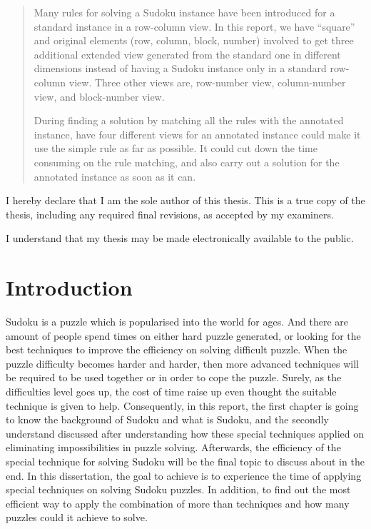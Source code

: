 \documentclass[11pt]{report}
\begin{document}
\begin{abstract}
Many rules for solving a Sudoku instance have been introduced for a standard instance in a row-column view. In this report, we have ``square'' and original elements (row, column, block, number) involved to get three additional extended view generated from the standard one in different dimensions instead of having a Sudoku instance only in a standard row-column view. Three other views are, row-number view, column-number view, and block-number view.

During finding a solution by matching all the rules with the annotated instance, have four different views for an annotated instance could make it use the simple rule as far as possible. It could cut down the time consuming on the rule matching, and also carry out a solution for the annotated instance as soon as it can.
\end{abstract}

I hereby declare that I am the sole author of this thesis. This is a true copy of the thesis, including any required final revisions, as accepted by my examiners.

I understand that my thesis may be made electronically available to the public.
\tableofcontents



\chapter{Introduction}
\label{cha:Introduction}


Sudoku is a puzzle which is popularised into the world for ages. And there are amount of people spend times on either hard puzzle generated, or looking for the best techniques to improve the efficiency on solving difficult puzzle.
When the puzzle difficulty becomes harder and harder, then more advanced techniques will be required to be used together or in order to cope the puzzle. Surely, as the difficulties level goes up, the cost of time raise up even thought the suitable technique is given to help. Consequently, in this report, the first chapter is going to know the background of Sudoku and what is Sudoku, and the secondly understand discussed after understanding how these special techniques applied on eliminating impossibilities in puzzle solving. Afterwards, the efficiency of the special technique for solving Sudoku will be the final topic to discuss about in the end.
In this dissertation, the goal to achieve is to experience the time of applying special techniques on solving Sudoku puzzles. In addition, to find out the most efficient way to apply the combination of more than techniques and how many puzzles could it achieve to solve.
\end{document}
